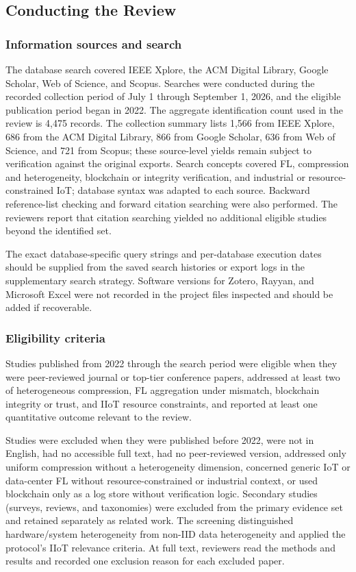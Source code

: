 \documentclass[journal]{IEEEtran}
\begin{document}
\subsection{Conducting the Review}
\label{subsec:conducting}

\subsubsection{Information sources and search}
\label{subsec:search}

The database search covered IEEE Xplore, the ACM Digital Library, Google Scholar, Web of Science, and Scopus. Searches were conducted during the recorded collection period of July 1 through September 1, 2026, and the eligible publication period began in 2022. The aggregate identification count used in the review is 4,475 records. The collection summary lists 1,566 from IEEE Xplore, 686 from the ACM Digital Library, 866 from Google Scholar, 636 from Web of Science, and 721 from Scopus; these source-level yields remain subject to verification against the original exports. Search concepts covered FL, compression and heterogeneity, blockchain or integrity verification, and industrial or resource-constrained IoT; database syntax was adapted to each source. Backward reference-list checking and forward citation searching were also performed. The reviewers report that citation searching yielded no additional eligible studies beyond the identified set.

The exact database-specific query strings and per-database execution dates should be supplied from the saved search histories or export logs in the supplementary search strategy. Software versions for Zotero, Rayyan, and Microsoft Excel were not recorded in the project files inspected and should be added if recoverable.

\subsubsection{Eligibility criteria}
\label{subsec:eligibility}

Studies published from 2022 through the search period were eligible when they were peer-reviewed journal or top-tier conference papers, addressed at least two of heterogeneous compression, FL aggregation under mismatch, blockchain integrity or trust, and IIoT resource constraints, and reported at least one quantitative outcome relevant to the review.

Studies were excluded when they were published before 2022, were not in English, had no accessible full text, had no peer-reviewed version, addressed only uniform compression without a heterogeneity dimension, concerned generic IoT or data-center FL without resource-constrained or industrial context, or used blockchain only as a log store without verification logic. Secondary studies (surveys, reviews, and taxonomies) were excluded from the primary evidence set and retained separately as related work. The screening distinguished hardware/system heterogeneity from non-IID data heterogeneity and applied the protocol's IIoT relevance criteria. At full text, reviewers read the methods and results and recorded one exclusion reason for each excluded paper.
\end{document}
